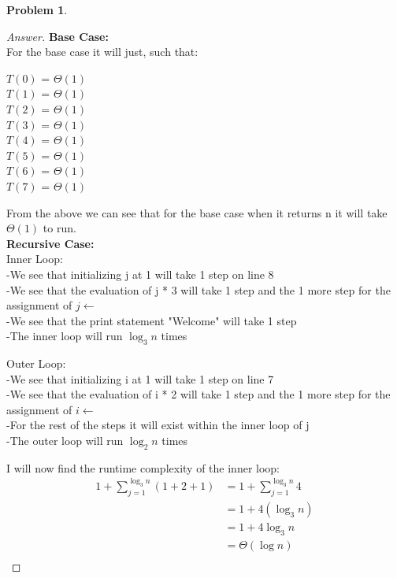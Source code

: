 \documentclass[11pt]{article}
\theoremstyle{definition}
\theoremstyle{definition}
\newtheorem{required}{Problem}
\theoremstyle{definition}
\begin{document}
\begin{required}
\begin{enumerate}[label=(\alph*)]
\begin{proof}[Answer]
\textbf{Base Case:} \\
For the base case it will just, such that: \\
\begin{center}
$T(0)$ = $\Theta(1)$ \\
$T(1)$ = $\Theta(1)$ \\ 
$T(2)$ = $\Theta(1)$ \\
$T(3)$ = $\Theta(1)$ \\
$T(4)$ = $\Theta(1)$ \\ 
$T(5)$ = $\Theta(1)$ \\
$T(6)$ = $\Theta(1)$ \\
$T(7)$ = $\Theta(1)$ \\
\end{center}
From the above we can see that for the base case when it returns n it will take $\Theta(1)$ to run. \\

\textbf{Recursive Case:} \\
Inner Loop: \\
\indent -We see that initializing j at 1 will take 1 step on line 8\\
\indent -We see that the evaluation of j * 3 will take 1 step and the 1 more step for the assignment of $j \gets$ \\
\indent -We see that the print statement "Welcome" will take 1 step \\
\indent -The inner loop will run $\log_3 n$ times

Outer Loop: \\
\indent -We see that initializing i at 1 will take 1 step on line 7\\
\indent -We see that the evaluation of i * 2 will take 1 step and the 1 more step for the assignment of $i \gets$ \\
\indent -For the rest of the steps it will exist within the inner loop of j \\
\indent -The outer loop will run $\log_2 n$ times



I will now find the runtime complexity of the inner loop: \\
\begin{align*}
1 + \sum_{j=1}^{\log_3 n} (1 + 2 + 1) &= 1 + \sum_{j=1}^{\log_3 n}  4 \\
&= 1 + 4(\log_3 n)\\
&= 1 + 4\log_3 n\\
&= \Theta(\log n) \\
\end{align*}


\end{proof}
\end{enumerate}
\end{required}
\end{document}
